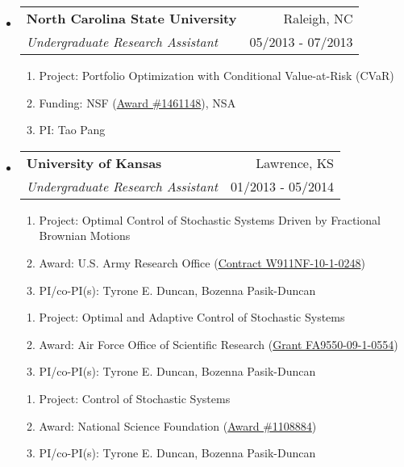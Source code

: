 \documentclass[letterpaper,10pt]{article}
\makeatletter
\newcommand{\subheadingtwo}[4]{
\begin{tabular*}{6.5in}{l@{\cftdotfill{\cftsecdotsep}\extracolsep{\fill}}r}
\textbf{#1} & #2 \\
#3 & {#4} \\
\end{tabular*}}
\makeatother
\begin{document}
\begin{itemize}[leftmargin=0.4cm]
\vspace{0.1cm}


\item[] \subheadingtwo{North Carolina State University}{Raleigh, NC}{\it Undergraduate Research Assistant}{05/2013 - 07/2013}

\begin{enumerate}[leftmargin=0.5cm]
	\setlength\itemsep{-0.05ex}
	\item[] Project: Portfolio Optimization with Conditional Value-at-Risk (CVaR)
	\item[] Funding: NSF (\href{https://www.nsf.gov/awardsearch/showAward?AWD_ID=1461148&HistoricalAwards=false}{Award \#1461148}), NSA
	\item[] PI: Tao Pang
\end{enumerate}


\vspace{0.2cm}


\item[] \subheadingtwo{University of Kansas}{Lawrence, KS}{\it Undergraduate Research Assistant}{01/2013 - 05/2014}

\begin{enumerate}[leftmargin=0.5cm]
	\setlength\itemsep{-0.05ex}
	\item[] Project: Optimal Control of Stochastic Systems Driven by Fractional Brownian Motions
	\item[] Award: U.S. Army Research Office (\href{http://www.dtic.mil/dtic/tr/fulltext/u2/a614716.pdf}{Contract W911NF-10-1-0248})
	\item[] PI/co-PI(s): Tyrone E. Duncan, Bozenna Pasik-Duncan
\end{enumerate}


\begin{enumerate}[leftmargin=0.5cm]
	\setlength\itemsep{-0.05ex}
	\item[] Project: Optimal and Adaptive Control of Stochastic Systems
	\item[] Award: Air Force Office of Scientific Research (\href{http://www.dtic.mil/dtic/tr/fulltext/u2/a567576.pdf}{Grant FA9550-09-1-0554})
	\item[] PI/co-PI(s): Tyrone E. Duncan, Bozenna Pasik-Duncan
\end{enumerate}


\begin{enumerate}[leftmargin=0.5cm]
	\setlength\itemsep{-0.05ex}
	\item[] Project: Control of Stochastic Systems
	\item[] Award: National Science Foundation (\href{https://www.nsf.gov/awardsearch/showAward?AWD_ID=1108884&HistoricalAwards=false}{Award \#1108884})
	\item[] PI/co-PI(s): Tyrone E. Duncan, Bozenna Pasik-Duncan
\end{enumerate}

\end{itemize}
\end{document}
